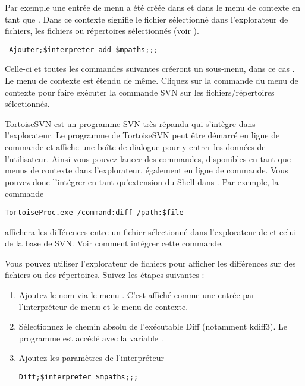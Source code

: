 Par exemple une entrée de menu a été créée dans  et dans le menu de contexte en tant que . Dans ce contexte  signifie le fichier sélectionné dans l'explorateur de fichiers,  les fichiers ou répertoires sélectionnés (voir ).

\begin{lstlisting}
 Ajouter;$interpreter add $mpaths;;;
\end{lstlisting}

Celle-ci et toutes les commandes suivantes créeront un sous-menu, dans ce cas . Le menu de contexte est étendu de même. Cliquez sur la commande du menu de contexte pour faire exécuter la commande SVN  sur les fichiers/répertoires sélectionnés.

TortoiseSVN est un programme SVN très répandu qui s'intègre dans l'explorateur. Le programme  de TortoiseSVN peut être démarré en ligne de commande et affiche une boîte de dialogue pour y entrer les données de l'utilisateur. Ainsi vous pouvez lancer des commandes, disponibles en tant que menus de contexte dans l'explorateur, également en ligne de commande. Vous pouvez donc l'intégrer en tant qu'extension du Shell dans  \codeblocks. Par exemple, la commande

\begin{lstlisting}
TortoiseProc.exe /command:diff /path:$file
\end{lstlisting}

affichera les différences entre un fichier sélectionné dans l'explorateur de \codeblocks et celui de la base de SVN. Voir  comment intégrer cette commande.



Vous pouvez utiliser l'explorateur de fichiers pour afficher les différences sur des fichiers ou des répertoires. Suivez les étapes suivantes :

\begin{enumerate}
\item Ajoutez le nom via le menu . C'est affiché comme une entrée par l'interpréteur de menu et le menu de contexte.
\item Sélectionnez le chemin absolu de l'exécutable Diff (notamment kdiff3). Le programme est accédé avec la variable .
\item Ajoutez les paramètres de l'interpréteur
\begin{lstlisting}
Diff;$interpreter $mpaths;;;
\end{lstlisting}
\end{enumerate}

